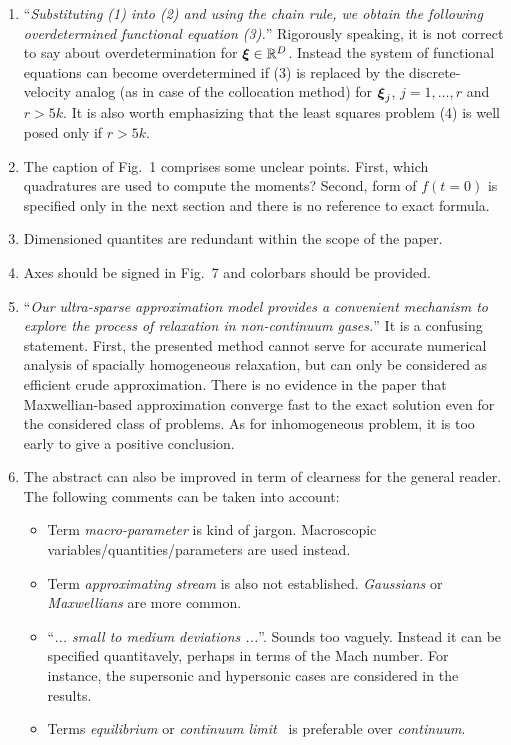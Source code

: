 \documentclass[11pt]{article}
\newcommand{\bxi}{\vb*{\xi}}
\begin{document}
\begin{enumerate}
    \item ``\emph{Substituting (1) into (2) and using the chain rule,
    we obtain the following overdetermined functional equation (3).}''
    Rigorously speaking, it is not correct to say about overdetermination for $\bxi\in\mathbb{R}^D$.
    Instead the system of functional equations can become overdetermined
    if (3) is replaced by the discrete-velocity analog (as in case of the collocation method)
    for $\bxi_j$, $j=1,\dots,r$ and $r>5k$.
    It is also worth emphasizing that the least squares problem (4) is well posed only if $r>5k$.

    \item The caption of Fig.~1 comprises some unclear points. First, which quadratures are used to compute the moments?
    Second, form of $f(t=0)$ is specified only in the next section and there is no reference to exact formula.

    \item Dimensioned quantites are redundant within the scope of the paper.

    \item Axes should be signed in Fig.~7 and colorbars should be provided.

    \item ``\emph{Our ultra-sparse approximation model provides a convenient mechanism
    to explore the process of relaxation in non-continuum gases.}''
    It is a confusing statement. First, the presented method cannot serve for accurate numerical analysis
    of spacially homogeneous relaxation, but can only be considered as efficient crude approximation.
    There is no evidence in the paper that Maxwellian-based approximation converge fast to the exact solution
    even for the considered class of problems.
    As for inhomogeneous problem, it is too early to give a positive conclusion.

    \item The abstract can also be improved in term of clearness for the general reader.
    The following comments can be taken into account:
    \begin{itemize}
        \item Term \emph{macro-parameter} is kind of jargon.
        Macroscopic variables/quantities/parameters are used instead.
        \item Term \emph{approximating stream} is also not established.
        \emph{Gaussians} or \emph{Maxwellians} are more common.
        \item ``\emph{... small to medium deviations ...}''. Sounds too vaguely.
        Instead it can be specified quantitavely, perhaps in terms of the Mach number.
        For instance, the supersonic and hypersonic cases are considered in the results.
        \item Terms \emph{equilibrium} or \emph{continuum limit}~\cite{Sone2007} is preferable over \emph{continuum}.
    \end{itemize}


\end{enumerate}
\end{document}
